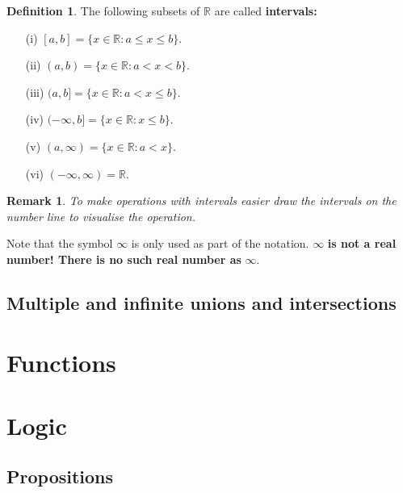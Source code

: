 \documentclass[12pt, a4paper]{article}
\newcommand{\bb}[1]{\mathbb{#1}}
\newcommand{\mb}[1]{\mathbf{#1}}
\newtheorem*{remark}{Remark}
\theoremstyle{definition}
\newtheorem{definition}{Definition}[section]
\theoremstyle{plain}
\begin{document}
\begin{definition}
The following subsets of $\bb{R}$ are called \textbf{intervals:}
\begin{enumerate}
	
	\item[(i)] $[a,b]=\{x\in \bb{R} : a\leq x \leq b\}.$

	\item[(ii)] $(a,b)= \{x\in \bb{R} : a< x <b\}.$

	\item[(iii)] $(a,b]=\{x\in \bb{R} : a< x \leq b\}.$

	\item[(iv)] $(-\infty,b]=\{x\in \bb{R} : x \leq b\}.$

	\item[(v)] $(a,\infty)= \{x\in \bb{R} : a < x\}.$

	\item[(vi)] $(-\infty, \infty)=\bb{R}.$

\end{enumerate}
\end{definition}

\begin{remark}
To make operations with intervals easier draw the intervals on the number line to visualise the operation.
\end{remark}

\begin{tcolorbox}
Note that the symbol $\infty$ is only used as part of the notation.
$\mb{\infty}$ \textbf{is not a real number! There is no such real number as} $\mb{\infty}.$
\end{tcolorbox}

\subsection{Multiple and infinite unions and intersections}




\section{Functions}



\section{Logic}

\subsection{Propositions}
\end{document}
